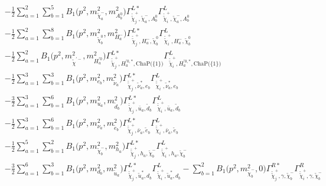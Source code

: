 \begin{itemize}
\begin{align}
 &-\frac{1}{2} \sum_{a=1}^{2}\sum_{b=1}^{5}{B_1\Big(p^{2},m^2_{\tilde{\chi}^-_{{a}}},m^2_{A^0_{{b}}}\Big)} {\Gamma^{L*}_{\check{\tilde{\chi}}^+_{{j}},\tilde{\chi}^-_{{a}},A^0_{{b}}}} {\Gamma^L_{\check{\tilde{\chi}}^+_{{i}},\tilde{\chi}^-_{{a}},A^0_{{b}}}}  \nonumber \\ 
 &-\frac{1}{2} \sum_{a=1}^{2}\sum_{b=1}^{8}{B_1\Big(p^{2},m^2_{\tilde{\chi}^0_{{b}}},m^2_{H^-_{{a}}}\Big)} {\Gamma^{L*}_{\check{\tilde{\chi}}^+_{{j}},H^-_{{a}},\tilde{\chi}^0_{{b}}}} {\Gamma^L_{\check{\tilde{\chi}}^+_{{i}},H^-_{{a}},\tilde{\chi}^0_{{b}}}}  \nonumber \\ 
 &-\frac{1}{2} \sum_{a=1}^{2}{B_1\Big(p^{2},m^2_{\tilde{\chi}^{'-}},m^2_{H^{'0}_{{a}}}\Big)} {\Gamma^{L*}_{\check{\tilde{\chi}}^+_{{j}},H^{{'0},*}_{{a}},\text{ChaP}\Big(\{1\}\Big)}} {\Gamma^L_{\check{\tilde{\chi}}^+_{{i}},H^{{'0},*}_{{a}},\text{ChaP}\Big(\{1\}\Big)}}  \nonumber \\ 
 &-\frac{1}{2} \sum_{a=1}^{3}\sum_{b=1}^{3}{B_1\Big(p^{2},m^2_{e_{{b}}},m^2_{\tilde{\nu}_{{a}}}\Big)} {\Gamma^{L*}_{\check{\tilde{\chi}}^+_{{j}},\tilde{\nu}^*_{{a}},e_{{b}}}} {\Gamma^L_{\check{\tilde{\chi}}^+_{{i}},\tilde{\nu}^*_{{a}},e_{{b}}}}  \nonumber \\ 
 &-\frac{3}{2} \sum_{a=1}^{3}\sum_{b=1}^{6}{B_1\Big(p^{2},m^2_{u_{{a}}},m^2_{\tilde{d}_{{b}}}\Big)} {\Gamma^{L*}_{\check{\tilde{\chi}}^+_{{j}},\bar{u}_{{a}},\tilde{d}_{{b}}}} {\Gamma^L_{\check{\tilde{\chi}}^+_{{i}},\bar{u}_{{a}},\tilde{d}_{{b}}}}  \nonumber \\ 
 &-\frac{1}{2} \sum_{a=1}^{3}\sum_{b=1}^{6}{B_1\Big(p^{2},m^2_{\nu_{{a}}},m^2_{\tilde{e}_{{b}}}\Big)} {\Gamma^{L*}_{\check{\tilde{\chi}}^+_{{j}},\bar{\nu}_{{a}},\tilde{e}_{{b}}}} {\Gamma^L_{\check{\tilde{\chi}}^+_{{i}},\bar{\nu}_{{a}},\tilde{e}_{{b}}}}  \nonumber \\ 
 &-\frac{1}{2} \sum_{a=1}^{5}\sum_{b=1}^{2}{B_1\Big(p^{2},m^2_{\tilde{\chi}^-_{{b}}},m^2_{h_{{a}}}\Big)} {\Gamma^{L*}_{\check{\tilde{\chi}}^+_{{j}},h_{{a}},\tilde{\chi}^-_{{b}}}} {\Gamma^L_{\check{\tilde{\chi}}^+_{{i}},h_{{a}},\tilde{\chi}^-_{{b}}}}  \nonumber \\ 
 &-\frac{3}{2} \sum_{a=1}^{6}\sum_{b=1}^{3}{B_1\Big(p^{2},m^2_{d_{{b}}},m^2_{\tilde{u}_{{a}}}\Big)} {\Gamma^{L*}_{\check{\tilde{\chi}}^+_{{j}},\tilde{u}^*_{{a}},d_{{b}}}} {\Gamma^L_{\check{\tilde{\chi}}^+_{{i}},\tilde{u}^*_{{a}},d_{{b}}}}  - \sum_{b=1}^{2}{B_1\Big(p^{2},m^2_{\tilde{\chi}^-_{{b}}},0\Big)} {\Gamma^{R*}_{\check{\tilde{\chi}}^+_{{j}},\gamma,\tilde{\chi}^-_{{b}}}} {\Gamma^R_{\check{\tilde{\chi}}^+_{{i}},\gamma,\tilde{\chi}^-_{{b}}}}  \nonumber \\ 

\end{align}
\end{itemize}
